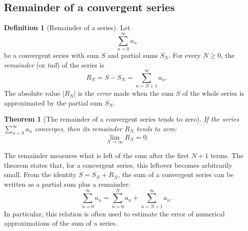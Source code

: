 \documentclass[11pt,a4paper]{article}
\theoremstyle{definition} \newtheorem{definition}{Definition} \theoremstyle{plain} \newtheorem{theorem}{Theorem}
\begin{document}
\subsection{Remainder of a convergent series}
\begin{definition}[Remainder of a series] Let
\[ \sum_{n=0}^{\infty} a_n \]
be a convergent series with sum $S$ and partial sums $S_N$.
For every $N\ge 0$, the \emph{remainder} (or \emph{tail}) of the series is
\[ R_N = S - S_N = \sum_{n=N+1}^{\infty} a_n. \]
The absolute value $|R_N|$ is the \emph{error} made when the sum $S$ of the whole series is approximated by the partial sum $S_N$. \end{definition}
\begin{theorem}[The remainder of a convergent series tends to zero]\label{thm:remainder-zero} If the series $\sum_{n=0}^{\infty} a_n$ converges, then its remainder $R_N$ tends to zero:
\[ \lim_{N\to\infty} R_N = 0. \]
\end{theorem}
The remainder measures what is left of the sum after the first $N+1$ terms.
The theorem states that, for a convergent series, this leftover becomes arbitrarily small.
From the identity $S = S_N + R_N$, the sum of a convergent series can be written as a partial sum plus a remainder:
\[ \sum_{n=0}^{\infty} a_n = \sum_{n=0}^{N} a_n + \sum_{n=N+1}^{\infty} a_n. \]
In particular, this relation is often used to estimate the error of numerical approximations of the sum of a series.
\end{document}
